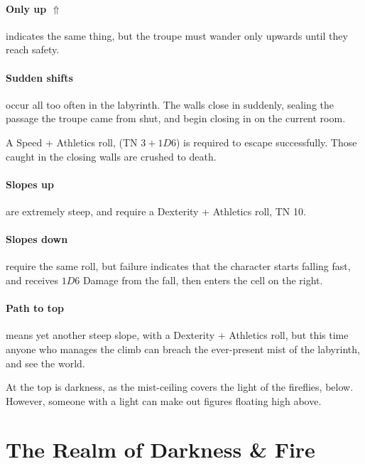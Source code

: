 \begin{multicols}{2}
\paragraph{Only up $\Uparrow$}
indicates the same thing, but the troupe must wander only upwards until they reach safety.

\paragraph{Sudden shifts}
occur all too often in the labyrinth.
The walls close in suddenly, sealing the passage the troupe came from shut, and begin closing in on the current room.

A Speed + Athletics roll, (TN $3 + 1D6$)
is required to escape successfully.
Those caught in the closing walls are crushed to death.

\paragraph{Slopes up}
are extremely steep, and require a Dexterity + Athletics roll, TN 10.

\paragraph{Slopes down}
require the same roll, but failure indicates that the character starts falling fast, and receives $1D6$ Damage from the fall, then enters the cell on the right.

\paragraph{Path to top}
means yet another steep slope, with a Dexterity + Athletics roll, but this time anyone who manages the climb can breach the ever-present mist of the labyrinth, and see the world.

At the top is darkness, as the mist-ceiling covers the light of the fireflies, below.
However, someone with a light can make out figures floating high above.

\end{multicols}


\section{The Realm of Darkness \& Fire}\label{darknessandfire}

